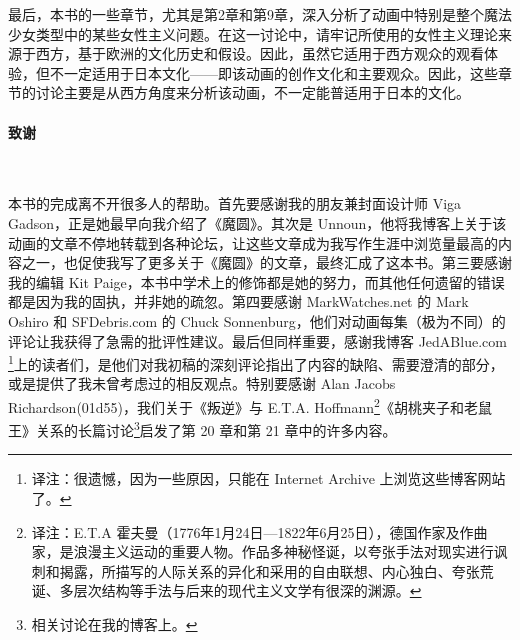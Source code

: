 最后，本书的一些章节，尤其是第2章和第9章，深入分析了动画中特别是整个魔法少女类型中的某些女性主义问题。在这一讨论中，请牢记所使用的女性主义理论来源于西方，基于欧洲的文化历史和假设。因此，虽然它适用于西方观众的观看体验，但不一定适用于日本文化——即该动画的创作文化和主要观众。因此，这些章节的讨论主要是从西方角度来分析该动画，不一定能普适用于日本的文化。
\paragraph{致谢}~{}

本书的完成离不开很多人的帮助。首先要感谢我的朋友兼封面设计师 Viga Gadson，正是她最早向我介绍了《魔圆》。其次是 Unnoun，他将我博客上关于该动画的文章不停地转载到各种论坛，让这些文章成为我写作生涯中浏览量最高的内容之一，也促使我写了更多关于《魔圆》的文章，最终汇成了这本书。第三要感谢我的编辑 Kit Paige，本书中学术上的修饰都是她的努力，而其他任何遗留的错误都是因为我的固执，并非她的疏忽。第四要感谢 MarkWatches.net 的 Mark Oshiro 和 SFDebris.com 的 Chuck Sonnenburg，他们对动画每集（极为不同）的评论让我获得了急需的批评性建议。最后但同样重要，感谢我博客 JedABlue.com \footnote{译注：很遗憾，因为一些原因，只能在 Internet Archive 上浏览这些博客网站了。}上的读者们，是他们对我初稿的深刻评论指出了内容的缺陷、需要澄清的部分，或是提供了我未曾考虑过的相反观点。特别要感谢 Alan Jacobs Richardson(01d55)，我们关于《叛逆》与 E.T.A. Hoffmann\footnote{译注：E.T.A 霍夫曼（1776年1月24日—1822年6月25日），德国作家及作曲家，是浪漫主义运动的重要人物。作品多神秘怪诞，以夸张手法对现实进行讽刺和揭露，所描写的人际关系的异化和采用的自由联想、内心独白、夸张荒诞、多层次结构等手法与后来的现代主义文学有很深的渊源。}《胡桃夹子和老鼠王》关系的长篇讨论\footnote{相关讨论在我的博客上。}\cite{ref8}启发了第 20 章和第 21 章中的许多内容。
